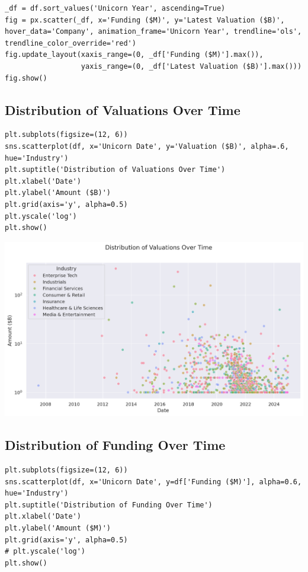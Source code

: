 \documentclass[a4paper,12pt]{article}
\begin{document}
\begin{verbatim}
_df = df.sort_values('Unicorn Year', ascending=True)
fig = px.scatter(_df, x='Funding ($M)', y='Latest Valuation ($B)', hover_data='Company', animation_frame='Unicorn Year', trendline='ols', trendline_color_override='red')
fig.update_layout(xaxis_range=(0, _df['Funding ($M)'].max()),
                  yaxis_range=(0, _df['Latest Valuation ($B)'].max()))
fig.show()
\end{verbatim}
\subsection{Distribution of Valuations Over Time}
\label{sec:orgd611eef}

\begin{verbatim}
plt.subplots(figsize=(12, 6))
sns.scatterplot(df, x='Unicorn Date', y='Valuation ($B)', alpha=.6, hue='Industry')
plt.suptitle('Distribution of Valuations Over Time')
plt.xlabel('Date')
plt.ylabel('Amount ($B)')
plt.grid(axis='y', alpha=0.5)
plt.yscale('log')
plt.show()
\end{verbatim}

\begin{center}
\includegraphics[width=.9\linewidth]{./.ob-jupyter/3952b0ffe7cc6297ac4c314ed80d5b934e4dd585.png}
\label{}
\end{center}
\subsection{Distribution of Funding Over Time}
\label{sec:orgbe23099}

\begin{verbatim}
plt.subplots(figsize=(12, 6))
sns.scatterplot(df, x='Unicorn Date', y=df['Funding ($M)'], alpha=0.6, hue='Industry')
plt.suptitle('Distribution of Funding Over Time')
plt.xlabel('Date')
plt.ylabel('Amount ($M)')
plt.grid(axis='y', alpha=0.5)
# plt.yscale('log')
plt.show()
\end{verbatim}
\end{document}
